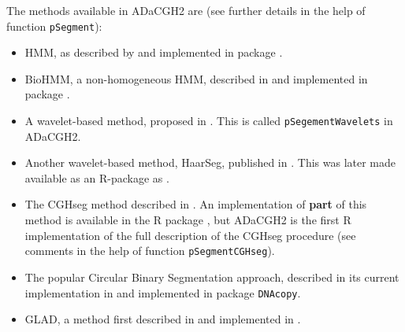 \documentclass[a4paper,11pt]{article}
\begin{document}
The methods available in ADaCGH2 are (see further details in the help of
function \texttt{pSegment}):

\begin{itemize}

\item HMM, as described by \cite{hmm-fridlyand} and implemented in package
  \cite{aCGHpackage}. 

\item BioHMM, a non-homogeneous HMM, described in \cite{biohmm} and
  implemented in package \cite{snapCGH}. 

\item A wavelet-based method, proposed in \cite{waves-hsu}. This is called
  \texttt{pSegementWavelets} in ADaCGH2. 

\item Another wavelet-based method, HaarSeg, published in
  \cite{haarseg-paper}. This was later made available as an R-package as
  \cite{haar-package}.

\item The CGHseg method described in \cite{cghseg}. An implementation of
  \textbf{part} of this method is available in the R package
  \cite{tilingarray}, but ADaCGH2 is the first R implementation of the
  full description of the CGHseg procedure (see comments in the help of
  function \texttt{pSegmentCGHseg}).

\item The popular Circular Binary Segmentation approach, described in its
  current implementation in \cite{CBS-paper} and implemented in package
  \texttt{DNAcopy}.

\item GLAD, a method first described in \cite{glad-paper} and implemented
  in \cite{glad-package}.

\end{itemize}
\end{document}
